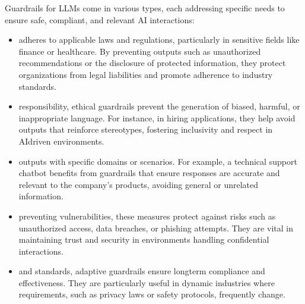 \documentclass[letterpaper,11pt,english]{sphinxmanual}
\begin{document}
\sphinxAtStartPar
Guardrails for LLMs come in various types, each addressing specific
needs to ensure safe, compliant, and relevant AI interactions:
\begin{itemize}
\item {} \begin{description}
\sphinxAtStartPar
adheres to applicable laws and regulations, particularly in sensitive
fields like finance or healthcare. By preventing outputs such as
unauthorized recommendations or the disclosure of protected
information, they protect organizations from legal liabilities and
promote adherence to industry standards.

\end{description}

\item {} \begin{description}
\sphinxAtStartPar
responsibility, ethical guardrails prevent the generation of biased,
harmful, or inappropriate language. For instance, in hiring
applications, they help avoid outputs that reinforce stereotypes,
fostering inclusivity and respect in AI\sphinxhyphen{}driven environments.

\end{description}

\item {} \begin{description}
\sphinxAtStartPar
outputs with specific domains or scenarios. For example, a technical
support chatbot benefits from guardrails that ensure responses are
accurate and relevant to the company’s products, avoiding general or
unrelated information.

\end{description}

\item {} \begin{description}
\sphinxAtStartPar
preventing vulnerabilities, these measures protect against risks such
as unauthorized access, data breaches, or phishing attempts. They are
vital in maintaining trust and security in environments handling
confidential interactions.

\end{description}

\item {} \begin{description}
\sphinxAtStartPar
and standards, adaptive guardrails ensure long\sphinxhyphen{}term compliance and
effectiveness. They are particularly useful in dynamic industries
where requirements, such as privacy laws or safety protocols,
frequently change.

\end{description}

\end{itemize}
\end{document}
